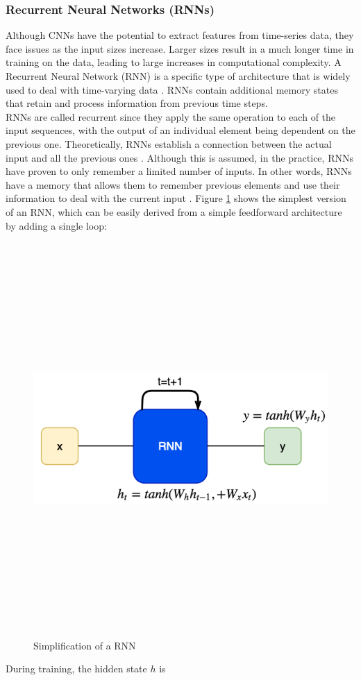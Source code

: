  \subsubsection{Recurrent Neural Networks (RNNs)}
 Although CNNs have the potential to extract features from time-series data, they face issues as the input sizes increase. Larger sizes result in a much longer time in 
 training on the data, leading to large increases in computational complexity. A Recurrent Neural Network (RNN) is a specific type of architecture that is 
 widely used to deal with time-varying data \cite{rnns}. RNNs contain additional memory states that retain and process information from previous
 time steps.\\ \newline \noindent RNNs are called recurrent since 
 they apply the same operation to each of the input sequences, with the output 
 of an individual element being dependent on the previous one. Theoretically, 
 RNNs establish a connection between the actual input and all the previous 
 ones \cite{rnns}. Although this is assumed, in the practice, RNNs have 
 proven to only remember a limited number of inputs. In other words, RNNs 
 have a memory that allows them to remember previous elements and use their 
 information to deal with the current 
 input \cite{deeplearning}. \noindent Figure \ref{rnn2} shows the simplest version 
of an RNN, which can be easily derived from a simple feedforward architecture by 
adding a single loop:
\begin{figure}[H]
    \centering
    \includegraphics[width=15cm,height=15cm,keepaspectratio]{Background/rnn2.png}
    \caption{Simplification of a RNN  \cite{deeplearning}}
    \label{rnn2}
\end{figure} \noindent During training, the hidden state $h$ is 

